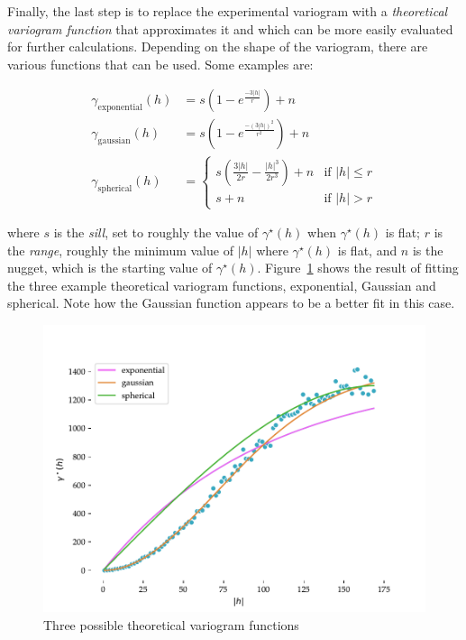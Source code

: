 Finally, the last step is to replace the experimental variogram with a \emph{theoretical variogram function} that approximates it and which can be more easily evaluated for further calculations.
Depending on the shape of the variogram, there are various functions that can be used.
Some examples are:

\begin{align}
\gamma_\mathrm{exponential}(h) &= s \left(1 - e^\frac{-3|h|}{r}\right) + n \\
\gamma_\mathrm{gaussian}(h) &= s \left(1 - e^\frac{-\left(3|h|\right)^2}{r^2}\right) + n \\
\gamma_\mathrm{spherical}(h) &= \begin{cases} 
   s \left(\frac{3|h|}{2r} - \frac{|h|^3}{2r^3}\right) + n & \text{if } |h| \leq r \\
   s + n & \text{if } |h| > r
  \end{cases}
\end{align}

where \(s\) is the \emph{sill}, set to roughly the value of \(\gamma^\star(h)\) when \(\gamma^\star(h)\) is  flat; \(r\) is the \emph{range}, roughly the minimum value of \(|h|\) where \(\gamma^\star(h)\) is flat, and \(n\) is the nugget, which is the starting value of \(\gamma^\star(h)\).
Figure~\ref{fig:theoretical_variogram} shows the result of fitting the three example theoretical variogram functions, exponential, Gaussian and spherical.
Note how the Gaussian function appears to be a better fit in this case.

\begin{figure}[htbp]
\centering
\includegraphics[width=0.8\linewidth]{figs/theoretical_variogram}
\caption{Three possible theoretical variogram functions}%
\label{fig:theoretical_variogram}
\end{figure}

